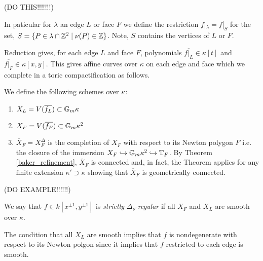 \documentclass[12pt]{article}
\begin{document}
\begin{example}
(DO THIS!!!!!!!)
\end{example}

\begin{defn}
In paticular for $\lambda$ an edge $L$ or face $F$ we define the restriction $f |_\lambda = f|_S$ for the set, $S = \{ P \in \lambda \cap \mathbb{Z}^2 \mid \nu(P) \in \mathbb{Z} \}$. Note, $S$ contains the vertices of $L$ or $F$.  
\end{defn}

\begin{rmk}
Reduction gives, for each edge $L$ and face $F$, polynomials $\overline{f|_L} \in \kappa[t]$ and $\overline{f|_F} \in \kappa[x, y]$. This gives affine curves over $\kappa$ on each edge and face which we complete in a toric compactification as follows.
\end{rmk}

\begin{defn}[Components]
We define the following schemes over $\kappa$:
\begin{enumerate}
\item $X_L = V(\overline{f_L}) \subset \mathbb{G}_m{\kappa}$ 
\item $X_F = V(\overline{f_F}) \subset \mathbb{G}_m{\kappa}^2$
\item $\overline{X}_F = X_F^\Delta$ is the completion of $X_F$ with respect to its Newton polygon $F$ i.e. the closure of the immersion $X_F \hookrightarrow \mathbb{G}_m{\kappa}^2 \hookrightarrow \mathbb{T}_F$. By Theorem \ref{baker_refinement}, $\overline{X}_F$ is connected and, in fact, the Theorem applies for any finite extension $\kappa' \supset \kappa$ showing that $\overline{X}_F$ is geometrically connected.
\end{enumerate}
\end{defn}

\begin{example}
(DO EXAMPLE!!!!!!)
\end{example}

\begin{defn}
We say that $f \in k[x^{\pm 1}, y^{\pm 1}]$ is \textit{strictly} $\Delta_\nu$-\textit{regular} if all $X_F$ and $X_L$ are smooth over $\kappa$. 
\end{defn}

\begin{rmk}
The condition that all $X_L$ are smooth implies that $f$ is nondegenerate with respect to its Newton polgon since it implies that $f$ restricted to each edge is smooth. 
\end{rmk}
\end{document}

